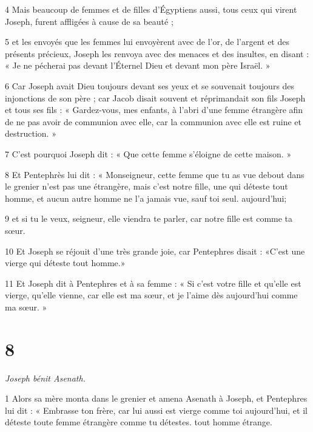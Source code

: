 \par 4 Mais beaucoup de femmes et de filles d'Égyptiens aussi, tous ceux qui virent Joseph, furent affligées à cause de sa beauté ;

\par 5 et les envoyés que les femmes lui envoyèrent avec de l'or, de l'argent et des présents précieux, Joseph les renvoya avec des menaces et des insultes, en disant : « Je ne pécherai pas devant l'Éternel Dieu et devant mon père Israël. »

\par 6 Car Joseph avait Dieu toujours devant ses yeux et se souvenait toujours des injonctions de son père ; car Jacob disait souvent et réprimandait son fils Joseph et tous ses fils : « Gardez-vous, mes enfants, à l'abri d'une femme étrangère afin de ne pas avoir de communion avec elle, car la communion avec elle est ruine et destruction. »

\par 7 C'est pourquoi Joseph dit : « Que cette femme s'éloigne de cette maison. »

\par 8 Et Pentephrès lui dit : « Monseigneur, cette femme que tu as vue debout dans le grenier n'est pas une étrangère, mais c'est notre fille, une qui déteste tout homme, et aucun autre homme ne l'a jamais vue, sauf toi seul. aujourd'hui;

\par 9 et si tu le veux, seigneur, elle viendra te parler, car notre fille est comme ta sœur.

\par 10 Et Joseph se réjouit d'une très grande joie, car Pentephres disait : «C'est une vierge qui déteste tout homme.»

\par 11 Et Joseph dit à Pentephres et à sa femme : « Si c'est votre fille et qu'elle est vierge, qu'elle vienne, car elle est ma sœur, et je l'aime dès aujourd'hui comme ma sœur. »

\chapter{8}


\par \textit{Joseph bénit Asenath.}

\par 1 Alors sa mère monta dans le grenier et amena Asenath à Joseph, et Pentephres lui dit : « Embrasse ton frère, car lui aussi est vierge comme toi aujourd'hui, et il déteste toute femme étrangère comme tu détestes. tout homme étrange.

